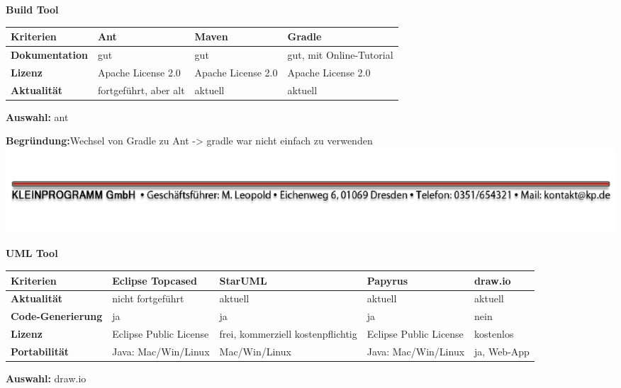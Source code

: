\documentclass[12pt]{article}
\begin{document}
\vspace*{10mm}

\textbf{Build Tool}

\begin{tabularx}{\textwidth}{|X|X|X|X|}\hline
 \textbf{Kriterien}&\textbf{Ant}&\textbf{Maven}&\textbf{Gradle}\\ \hline
 \textbf{Dokumentation}&gut&gut&gut, mit Online-Tutorial\\ \hline
 \textbf{Lizenz}&Apache License 2.0&Apache License 2.0&Apache License 2.0\\ \hline
 \textbf{Aktualität}&fortgeführt, aber alt&aktuell&aktuell\\ \hline
\end{tabularx}

\vspace*{3mm}

\textbf{Auswahl:} ant

\textbf{Begründung:}Wechsel von Gradle zu Ant -> gradle war nicht einfach zu verwenden
\vspace*{30mm}
\vspace*{\fill}
\includegraphics[scale=0.9]{footer.pdf}
\thispagestyle{empty}


\textbf{UML Tool}

\begin{tabularx}{\textwidth}{|X|X|X|X|X|}\hline
 \textbf{Kriterien}&\textbf{Eclipse Topcased}&\textbf{StarUML}&\textbf{Papyrus}&\textbf{draw.io}\\ \hline
 \textbf{Aktualität}&nicht fortgeführt&aktuell&aktuell&aktuell\\ \hline
 \textbf{Code-Generierung}&ja&ja&ja&nein\\ \hline
 \textbf{Lizenz}&Eclipse Public License&frei, kommerziell kostenpflichtig&Eclipse Public License&kostenlos\\ \hline
 \textbf{Portabilität}&Java: Mac/Win/Linux&Mac/Win/Linux&Java: Mac/Win/Linux&ja, Web-App\\ \hline
\end{tabularx}

\vspace*{3mm}

\textbf{Auswahl:} draw.io
\end{document}
